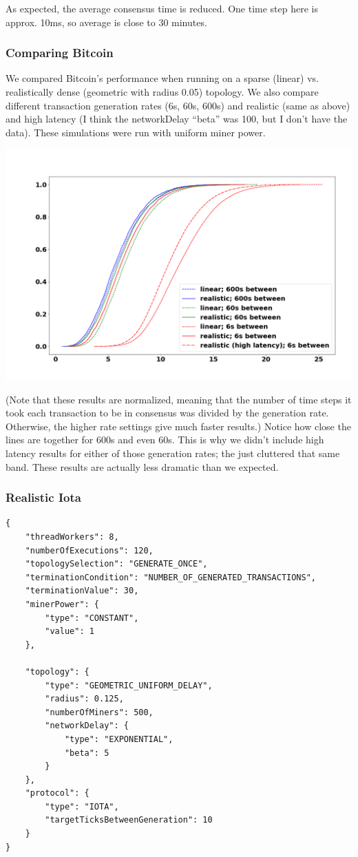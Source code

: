 \documentclass[letterpaper,11pt]{article}
\begin{document}
As expected, the average consensus time is reduced. One time step here is approx. 10ms, so average is close to 30 minutes.

\subsubsection{Comparing Bitcoin}

We compared Bitcoin's performance when running on a sparse (linear) vs. realistically dense (geometric with radius 0.05) topology. We also compare different transaction generation rates (6s, 60s, 600s) and realistic (same as above) and high latency (I think the networkDelay ``beta'' was 100, but I don't have the data). These simulations were run with uniform miner power.

\includegraphics[scale=0.2]{bccomp}

(Note that these results are normalized, meaning that the number of time steps it took each transaction to be in consensus was divided by the generation rate. Otherwise, the higher rate settings give much faster results.) Notice how close the lines are together for 600s and even 60s. This is why we didn't include high latency results for either of those generation rates; the just cluttered that same band. These results are actually less dramatic than we expected.

\subsubsection{Realistic Iota}
\begin{verbatim}
{
    "threadWorkers": 8,
    "numberOfExecutions": 120,
    "topologySelection": "GENERATE_ONCE", 
    "terminationCondition": "NUMBER_OF_GENERATED_TRANSACTIONS",
    "terminationValue": 30,
    "minerPower": {
        "type": "CONSTANT",
        "value": 1
    },

    "topology": {
        "type": "GEOMETRIC_UNIFORM_DELAY",
        "radius": 0.125,
        "numberOfMiners": 500,
        "networkDelay": {
            "type": "EXPONENTIAL",
            "beta": 5
        }
    },
    "protocol": {
        "type": "IOTA",
        "targetTicksBetweenGeneration": 10
    }
}
\end{verbatim}
\end{document}
